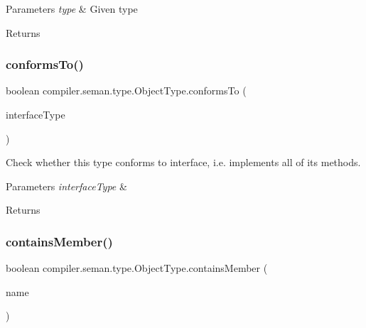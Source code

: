 \begin{DoxyParams}{Parameters}
{\em type} & Given type \\
\hline
\end{DoxyParams}
\begin{DoxyReturn}{Returns}

\end{DoxyReturn}
\mbox{\label{classcompiler_1_1seman_1_1type_1_1_object_type_aaedfa8514dec5c2ad15bf07b098db072}} 
\subsubsection{\texorpdfstring{conforms\+To()}{conformsTo()}}
{\footnotesize\ttfamily boolean compiler.\+seman.\+type.\+Object\+Type.\+conforms\+To (\begin{DoxyParamCaption}\item[{\hyperlink{classcompiler_1_1seman_1_1type_1_1_interface_type}{Interface\+Type}}]{interface\+Type }\end{DoxyParamCaption})}

Check whether this type conforms to interface, i.\+e. implements all of it\textquotesingle{}s methods. 
\begin{DoxyParams}{Parameters}
{\em interface\+Type} & \\
\hline
\end{DoxyParams}
\begin{DoxyReturn}{Returns}

\end{DoxyReturn}
\mbox{\label{classcompiler_1_1seman_1_1type_1_1_object_type_a9638597ad48a5f7f5ffee7e4c97d99b3}} 
\subsubsection{\texorpdfstring{contains\+Member()}{containsMember()}}
{\footnotesize\ttfamily boolean compiler.\+seman.\+type.\+Object\+Type.\+contains\+Member (\begin{DoxyParamCaption}\item[{String}]{name }\end{DoxyParamCaption})}


